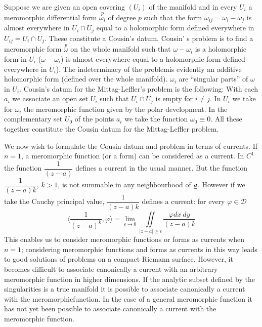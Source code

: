 Suppose we are given an open covering $(U_{i})$ of the manifold and in
every $U_{i}$ a meromorphic differential form
$\overset{p}{\omega_{i}}$ of degree $p$ such that the form
$\omega_{ij}=\omega_{i}-\omega_{j}$ is almost everywhere in $U_{i}\cap
U_{j}$ equal to a holomorphic form defined everywhere in
$U_{ij}=U_{i}\cap U_{j}$. These constitute a Cousin's datum. Cousin'
s problem is to find a meromorphic form $\overset{p}{\omega}$ on the
whole manifold such that $\omega-\omega_{i}$ is a holomorphic form in
$U_{i}$ (\iec $\omega-\omega_{i}$) is almost everywhere equal to a
holomorphic form defined everywhere in $U_{i}$). The indeterminacy of
the problem\pageoriginale is evidently an additive holomorphic form
(defined over the whole manifold). $\omega_{i}$ are ``singular parts''
of $\omega$ in $U_{i}$. Cousin's datum for the Mittag-Leffler's
problem is the following: With each $a_{i}$ we associate an open set
$U_{i}$ such that $U_{i}\cap U_{j}$ is empty for $i\neq j$. In $U_{i}$
we take for $\omega_{i}$ the meromorphic function given by the polar
development. In the complementary set $U_{0}$ of the points $a_{i}$ we
take the function $\omega_{0}\equiv 0$. All these together constitute
the Cousin datum for the Mittag-Leffler problem.

We now wish to formulate the Cousin datum and problem in terms of
currents. If $n=1$, a meromorphic function (or a form) can be
considered as a current. In $C^{1}$ the function $\dfrac{1}{(z-a)}$
defines a current in the usual manner. But the function
$\dfrac{1}{(z-a)k}$, $k>1$, is not summable in any neighbourhood of
$\underline{a}$. However if we take the Cauchy principal value,
$\dfrac{1}{(z-a)k}$ defines a current: for every
$\varphi\in\mathscr{D}$ 
$$
\langle \frac{1}{(z-a)^k},\varphi\rangle =\lim\limits_{\epsilon\to
  0}\iint\limits_{|z-a|\geq \epsilon}\frac{\varphi dx\ dy}{(z-a)k} 
$$
This enables us to consider meromorphic functions or forms as currents
when $n=1$; considering meromorphic functions and forms as currents in
this way leads to good solutions of problems on a compact Riemann
surface. However, it becomes difficult to associate canonically a
current with an arbitrary meromorphic function in higher
dimensions. If the analytic subset defined by the singularities is a
true manifold it is possible to associate canonically a current with
the meromorphic\pageoriginale function. In the case of a general
meromorphic function it has not yet been possible to associate
canonically a current with the meromorphic function.

